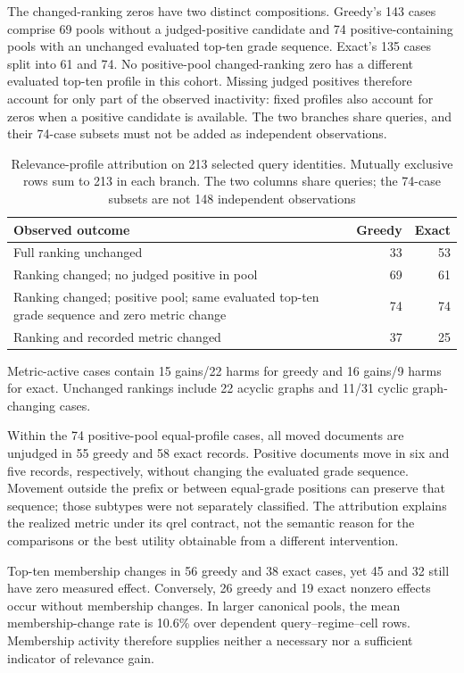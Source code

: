 \documentclass[pdflatex,iicol,sn-basic,Numbered]{sn-jnl}
\begin{document}
The changed-ranking zeros have two distinct compositions. Greedy's 143 cases comprise 69 pools without a judged-positive candidate and 74 positive-containing pools with an unchanged evaluated top-ten grade sequence. Exact's 135 cases split into 61 and 74. No positive-pool changed-ranking zero has a different evaluated top-ten profile in this cohort. Missing judged positives therefore account for only part of the observed inactivity: fixed profiles also account for zeros when a positive candidate is available. The two branches share queries, and their 74-case subsets must not be added as independent observations.

\begin{table}[t]
\caption{Relevance-profile attribution on 213 selected query identities. Mutually exclusive rows sum to 213 in each branch. The two columns share queries; the 74-case subsets are not 148 independent observations}
\label{tab:grades}\papertable
\begin{tabularx}{\linewidth}{@{}Yrr@{}}\toprule
Observed outcome & Greedy & Exact\\\midrule
Full ranking unchanged&33&53\\\addlinespace
Ranking changed; no judged positive in pool&69&61\\\addlinespace
Ranking changed; positive pool; same evaluated top-ten grade sequence and zero metric change&74&74\\\addlinespace
Ranking and recorded metric changed&37&25\\\bottomrule
\end{tabularx}
\smallskip\small
Metric-active cases contain 15 gains/22 harms for greedy and 16 gains/9 harms for exact. Unchanged rankings include 22 acyclic graphs and 11/31 cyclic graph-changing cases.
\end{table}

Within the 74 positive-pool equal-profile cases, all moved documents are unjudged in 55 greedy and 58 exact records. Positive documents move in six and five records, respectively, without changing the evaluated grade sequence. Movement outside the prefix or between equal-grade positions can preserve that sequence; those subtypes were not separately classified. The attribution explains the realized metric under its qrel contract, not the semantic reason for the comparisons or the best utility obtainable from a different intervention.

Top-ten membership changes in 56 greedy and 38 exact cases, yet 45 and 32 still have zero measured effect. Conversely, 26 greedy and 19 exact nonzero effects occur without membership changes. In larger canonical pools, the mean membership-change rate is 10.6\% over dependent query--regime--cell rows. Membership activity therefore supplies neither a necessary nor a sufficient indicator of relevance gain.
\end{document}
